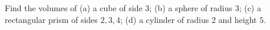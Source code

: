 Find the volumes of (a) a cube of side $3$; (b) a sphere of radius $3$; (c) a rectangular prism of sides $2,3,4$; (d) a cylinder of radius $2$ and height $5$.
